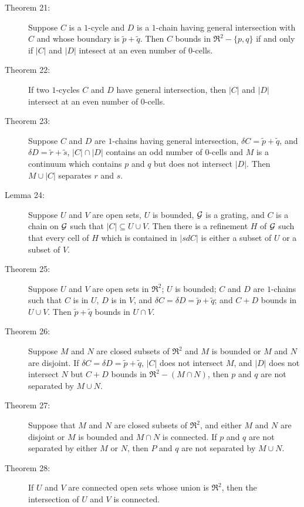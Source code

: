 \documentclass{article}
\begin{document}
\begin{description}
  \item[Theorem 21:] Suppose $C$ is a $1$-cycle and $D$ is a $1$-chain having general intersection with $C$ and whose boundary is $\tilde{p} + \tilde{q}$. Then $C$ bounds in $\Re^2 - \{p,q\}$ if and only if $|C|$ and $|D|$ intesect at an even number of $0$-cells.

  \item[Theorem 22:] If two $1$-cycles $C$ and $D$ have general intersection, then $|C|$ and $|D|$ intersect at an even number of $0$-cells.

  \item[Theorem 23:] Suppose $C$ and $D$ are $1$-chains having general intersection, $\delta C = \tilde{p} + \tilde{q}$, and $\delta D = \tilde{r} + \tilde{s}$, $|C| \cap |D|$ contains an odd number of $0$-cells and $M$ is a continuum which contains $p$ and $q$ but does not intersect $|D|$. Then $M \cup |C|$ separates $r$ and $s$.

  \item[Lemma 24:] Suppose $U$ and $V$ are open sets, $U$ is bounded, ${\cal G}$ is a grating, and $C$ is a chain on ${\cal G}$ such that $|C| \subseteq U \cup V$. Then there is a refinement $H$ of ${\cal G}$ such that every cell of $H$ which is contained in $|sdC|$ is either a subset of $U$ or a subset of $V$.

  \item[Theorem 25:] Suppose $U$ and $V$ are open sets in $\Re^2$; $U$ is bounded; $C$ and $D$ are $1$-chains such that $C$ is in $U$, $D$ is in $V$, and $\delta C = \delta D = \tilde{p} + \tilde{q}$; and $C+D$ bounds in $U \cup V$. Then $\tilde{p} + \tilde{q}$ bounds in $U \cap V$.

  \item[Theorem 26:] Suppose $M$ and $N$ are closed subsets of $\Re^2$ and $M$ is bounded or $M$ and $N$ are disjoint. If $\delta C = \delta D = \tilde{p} + \tilde{q}$, $|C|$ does not intersect $M$, and $|D|$ does not intersect $N$ but $C+D$ bounds in $\Re^2 - (M \cap N)$, then $p$ and $q$ are not separated by $M \cup N$.

  \item[Theorem 27:] Suppose that $M$ and $N$ are closed subsets of $\Re^2$, and either $M$ and $N$ are disjoint or $M$ is bounded and $M \cap N$ is connected. If $p$ and $q$ are not separated by either $M$ or $N$, then $P$ and $q$ are not separated by $M \cup N$.

  \item[Theorem 28:] If $U$ and $V$ are connected open sets whose union is $\Re^2$, then the intersection of $U$ and $V$ is connected.


\end{description}
\end{document}
